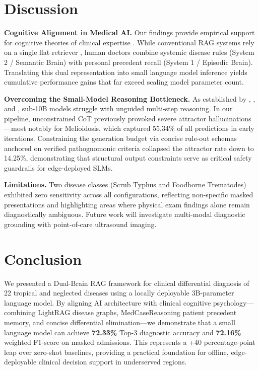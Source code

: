 \documentclass{article}
\begin{document}
\section{Discussion}

\textbf{Cognitive Alignment in Medical AI.} Our findings provide empirical support for cognitive theories of clinical expertise \citep{schmidt1990cognitive,croskerry2009universal}. While conventional RAG systems rely on a single flat retriever \citep{xiong2024benchmarking}, human doctors combine systemic disease rules (System 2 / Semantic Brain) with personal precedent recall (System 1 / Episodic Brain). Translating this dual representation into small language model inference yields cumulative performance gains that far exceed scaling model parameter count.

\textbf{Overcoming the Small-Model Reasoning Bottleneck.} As established by \citet{wei2022chain}, \citet{fu2023specializing}, and \citet{li2025small}, sub-10B models struggle with unguided multi-step reasoning. In our pipeline, unconstrained CoT previously provoked severe attractor hallucinations---most notably for Melioidosis, which captured 55.34\% of all predictions in early iterations. Constraining the generation budget via concise rule-out schemas \citep{renze2024benefits} anchored on verified pathognomonic criteria \citep{cheng2005melioidosis} collapsed the attractor rate down to 14.25\%, demonstrating that structural output constraints serve as critical safety guardrails for edge-deployed SLMs.

\textbf{Limitations.} Two disease classes (Scrub Typhus and Foodborne Trematodes) exhibited zero sensitivity across all configurations, reflecting non-specific masked presentations and highlighting areas where physical exam findings alone remain diagnostically ambiguous. Future work will investigate multi-modal diagnostic grounding with point-of-care ultrasound imaging.

\section{Conclusion}

We presented a Dual-Brain RAG framework for clinical differential diagnosis of 22 tropical and neglected diseases using a locally deployable 3B-parameter language model. By aligning AI architecture with clinical cognitive psychology---combining LightRAG disease graphs, MedCaseReasoning patient precedent memory, and concise differential elimination---we demonstrate that a small language model can achieve \textbf{72.33\%} Top-3 diagnostic accuracy and \textbf{72.16\%} weighted F1-score on masked admissions. This represents a +40 percentage-point leap over zero-shot baselines, providing a practical foundation for offline, edge-deployable clinical decision support in underserved regions.
\end{document}
